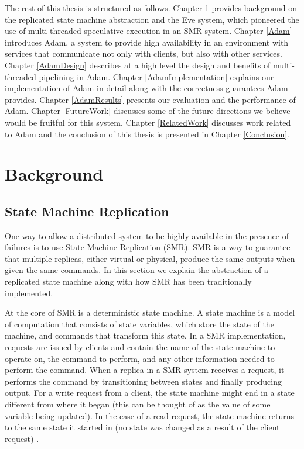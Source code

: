 \documentclass[11pt, oneside]{report}
\begin{document}
The rest of this thesis is structured as follows. 
Chapter \ref{Background} provides background on the replicated state machine abstraction and the Eve system, which pioneered the use of multi-threaded speculative execution in an SMR system. 
Chapter \ref{Adam} introduces Adam, a system to provide high availability in an environment with services that communicate not only with clients, but also with other services. 
Chapter \ref{AdamDesign} describes at a high level the design and benefits of multi-threaded pipelining in Adam. 
Chapter \ref{AdamImplementation} explains our implementation of Adam in detail along with the correctness guarantees Adam provides. 
Chapter \ref{AdamResults} presents our evaluation and the performance of Adam. 
Chapter \ref{FutureWork} discusses some of the future directions we believe would be fruitful for this system.
Chapter \ref{RelatedWork} discusses work related to Adam and the conclusion of this thesis is presented in Chapter \ref{Conclusion}.

\chapter{Background}\label{Background}
\section{State Machine Replication}
One way to allow a distributed system to be highly available in the presence of failures is to use State Machine Replication (SMR).
SMR is a way to guarantee that multiple replicas, either virtual or physical, produce the same outputs when given the same commands. 
In this section we explain the abstraction of a replicated state machine along with how SMR has been traditionally implemented.

At the core of SMR is a deterministic state machine. 
A state machine is a model of computation that consists of state variables, which store the state of the machine, and commands that transform this state. 
In a SMR implementation, requests are issued by clients and contain the name of the state machine to operate on, the command to perform, and any other information needed to perform the command. 
When a replica in a SMR system receives a request, it performs the command by transitioning between states and finally producing output. 
For a write request from a client, the state machine might end in a state different from where it began (this can be thought of as the value of some variable being updated). 
In the case of a read request, the state machine returns to the same state it started in (no state was changed as a result of the client request) \cite{schneider}.
\end{document}
